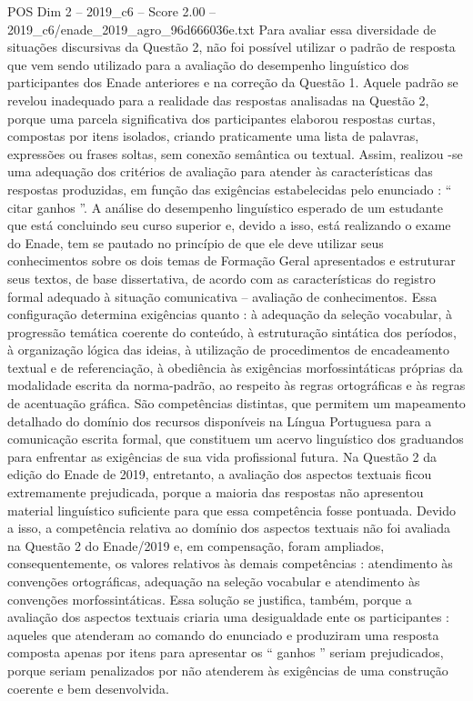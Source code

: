 \begin{textsample}{POS Dim 2 – 2019\_c6 – Score 2.00 – 2019\_c6/enade\_2019\_agro\_96d666036e.txt}
Para avaliar essa diversidade de situações discursivas da Questão 2, não foi possível utilizar o padrão de resposta que vem sendo utilizado para a avaliação do desempenho linguístico dos participantes dos Enade anteriores e na correção da Questão 1.
Aquele padrão se revelou inadequado para a realidade das respostas analisadas na Questão 2, porque uma parcela significativa dos participantes elaborou respostas curtas, compostas por itens isolados, criando praticamente uma lista de palavras, expressões ou frases soltas, sem conexão semântica ou textual.
Assim, realizou -se uma adequação dos critérios de avaliação para atender às características das respostas produzidas, em função das exigências estabelecidas pelo enunciado : “ citar ganhos ”.
A análise do desempenho linguístico esperado de um estudante que está concluindo seu curso superior e, devido a isso, está realizando o exame do Enade, tem se pautado no princípio de que ele deve utilizar seus conhecimentos sobre os dois temas de Formação Geral apresentados e estruturar seus textos, de base dissertativa, de acordo com as características do registro formal adequado à situação comunicativa – avaliação de conhecimentos.
Essa configuração determina exigências quanto : à adequação da seleção vocabular, à progressão temática coerente do conteúdo, à estruturação sintática dos períodos, à organização lógica das ideias, à utilização de procedimentos de encadeamento textual e de referenciação, à obediência às exigências morfossintáticas próprias da modalidade escrita da norma-padrão, ao respeito às regras ortográficas e às regras de acentuação gráfica.
São competências distintas, que permitem um mapeamento detalhado do domínio dos recursos disponíveis na Língua Portuguesa para a comunicação escrita formal, que constituem um acervo linguístico dos graduandos para enfrentar as exigências de sua vida profissional futura.
Na Questão 2 da edição do Enade de 2019, entretanto, a avaliação dos aspectos textuais ficou extremamente prejudicada, porque a maioria das respostas não apresentou material linguístico suficiente para que essa competência fosse pontuada.
Devido a isso, a competência relativa ao domínio dos aspectos textuais não foi avaliada na Questão 2 do Enade/2019 e, em compensação, foram ampliados, consequentemente, os valores relativos às demais competências : atendimento às convenções ortográficas, adequação na seleção vocabular e atendimento às convenções morfossintáticas.
Essa solução se justifica, também, porque a avaliação dos aspectos textuais criaria uma desigualdade ente os participantes : aqueles que atenderam ao comando do enunciado e produziram uma resposta composta apenas por itens para apresentar os “ ganhos ” seriam prejudicados, porque seriam penalizados por não atenderem às exigências de uma construção coerente e bem desenvolvida.

\end{textsample}
